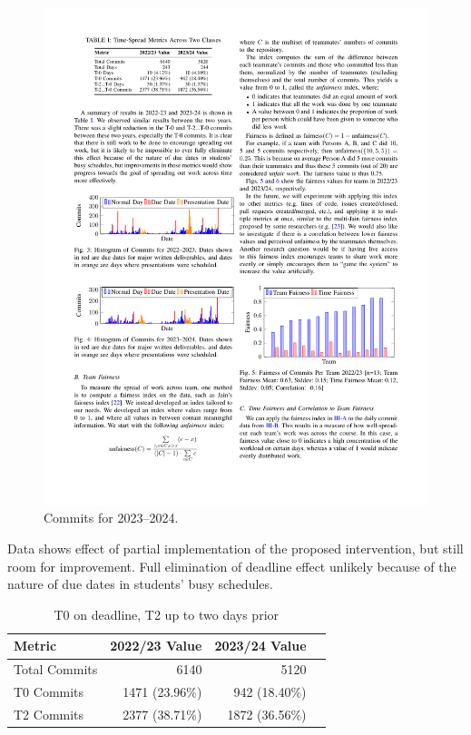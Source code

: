 \documentclass[poster, a1, plainboxedsections]{sciposter}
\begin{document}
\begin{multicols}{2}
\begin{figure}[h!]
\centering
\includegraphics[width=0.9\linewidth]{../figures/HistCommits2023-24.pdf}
\caption{Commits for 2023--2024.}\label{Fig_23_24Timeline}
\end{figure}

Data shows effect of partial implementation of the proposed intervention, but
still room for improvement. Full elimination of deadline effect unlikely because
of the nature of due dates in students' busy schedules.

\begin{table}
\caption{T0 on deadline, T2 up to two days prior}
\centering
\begin{tabular}{@{}lrrr@{}}
\toprule
\textbf{Metric} & \textbf{2022/23 Value} & \textbf{2023/24 Value} \\ 
\midrule
Total Commits & 6140 & 5120 \\
T0 Commits & 1471 (23.96\%) & 942 (18.40\%) \\
T2 Commits & 2377 (38.71\%) & 1872 (36.56\%) \\ 
\bottomrule
\end{tabular}
\end{table}


\end{multicols}
\end{document}
